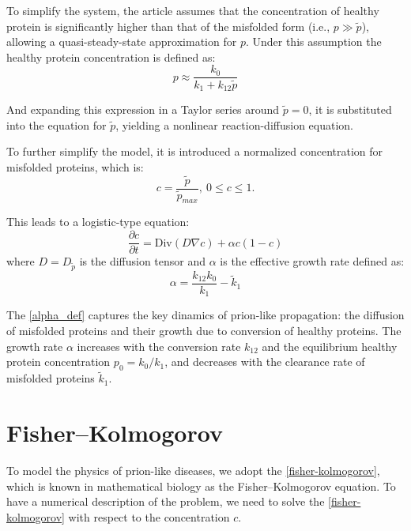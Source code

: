 \documentclass[12pt, a4paper, twoside, openright]{report}
\begin{document}
To simplify the system, the article \cite{WEICKENMEIER2019264} assumes that the concentration of healthy protein is significantly higher than that of the misfolded form (i.e., $p \gg \tilde{p}$), allowing a quasi-steady-state approximation for $p$. Under this assumption the healthy protein concentration is defined as:
\begin{equation}
p \approx \frac{k_0}{k_1 + k_{12}\tilde{p}}
\end{equation}

And expanding this expression in a Taylor series around $\tilde{p}=0$, it is substituted into the equation for $\tilde{p}$, yielding a nonlinear reaction-diffusion equation.

To further simplify the model, it is introduced a normalized concentration for misfolded proteins, which is:
\begin{equation}
    c = \frac{\tilde{p}}{\tilde{p}_{max}},\ 0\le c\le 1.
\end{equation}

This leads to a logistic-type equation:
\begin{equation}
    \frac{\partial c}{\partial t} = \text{Div}(D \nabla c) + \alpha c (1 - c)
\end{equation}
where $D=D_{\tilde{p}}$ is the diffusion tensor and  $\alpha$ is the effective growth rate defined as:
\begin{equation} \label{alpha_def}
    \alpha = \frac{k_{12} k_0}{k_1} - \tilde{k}_1
\end{equation}

The \autoref{alpha_def} captures the key dinamics of prion-like propagation: the diffusion of misfolded proteins and their growth due to conversion of healthy proteins.
The growth rate $\alpha$ increases with the conversion rate $k_{12}$ and the equilibrium healthy protein concentration $p_0 = k_0 / k_1$, and decreases with the clearance rate of misfolded proteins $\tilde{k}_1$.

\section{Fisher–Kolmogorov}
To model the physics of
prion-like diseases, we adopt the \autoref{fisher-kolmogorov}, which is known in mathematical biology as the Fisher–Kolmogorov equation. To have a numerical description of the problem, we need to solve the \autoref{fisher-kolmogorov} with respect to the concentration $c$.
\end{document}
